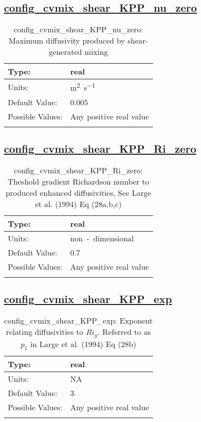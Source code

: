\subsection[config\_cvmix\_shear\_KPP\_nu\_zero]{\hyperref[sec:nm_tab_cvmix]{config\_cvmix\_shear\_KPP\_nu\_zero}}
\label{subsec:nm_sec_config_cvmix_shear_KPP_nu_zero}
\begin{center}
\begin{longtable}{| p{2.0in} || p{4.0in} |}
    \hline
    Type: & real \\
    \hline
    Units: & \si{m^2.s^{-1}} \\
    \hline
    Default Value: & 0.005 \\
    \hline
    Possible Values: & Any positive real value \\
    \hline
    \caption{config\_cvmix\_shear\_KPP\_nu\_zero: Maximum diffusivity produced by shear-generated mixing}
\end{longtable}
\end{center}
\subsection[config\_cvmix\_shear\_KPP\_Ri\_zero]{\hyperref[sec:nm_tab_cvmix]{config\_cvmix\_shear\_KPP\_Ri\_zero}}
\label{subsec:nm_sec_config_cvmix_shear_KPP_Ri_zero}
\begin{center}
\begin{longtable}{| p{2.0in} || p{4.0in} |}
    \hline
    Type: & real \\
    \hline
    Units: & \si{non-dimensional} \\
    \hline
    Default Value: & 0.7 \\
    \hline
    Possible Values: & Any positive real value \\
    \hline
    \caption{config\_cvmix\_shear\_KPP\_Ri\_zero: Theshold gradient Richardson number to produced enhanced diffusivities, See Large et al. (1994) Eq (28a,b,c)}
\end{longtable}
\end{center}
\subsection[config\_cvmix\_shear\_KPP\_exp]{\hyperref[sec:nm_tab_cvmix]{config\_cvmix\_shear\_KPP\_exp}}
\label{subsec:nm_sec_config_cvmix_shear_KPP_exp}
\begin{center}
\begin{longtable}{| p{2.0in} || p{4.0in} |}
    \hline
    Type: & real \\
    \hline
    Units: & \si{NA} \\
    \hline
    Default Value: & 3 \\
    \hline
    Possible Values: & Any positive real value \\
    \hline
    \caption{config\_cvmix\_shear\_KPP\_exp: Exponent relating diffusivities to $Ri_g$. Referred to as $p_1$ in Large et al. (1994) Eq (28b)}
\end{longtable}
\end{center}
